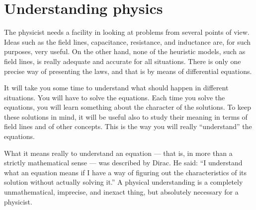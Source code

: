 \section{Understanding physics}

The physicist needs a facility in looking at problems from several points of view.
Ideas such as the field lines, capacitance, resistance, and inductance are,
for such purposes, very useful.
On the other hand, none of the heuristic models, such as field lines,
is really adequate and accurate for all situations.
There is only one precise way of presenting the laws,
and that is by means of differential equations.

It will take you some time to understand what should happen in different situations.
You will have to solve the equations.
Each time you solve the equations, 
you will learn something about the character of the solutions.
To keep these solutions in mind, it will be useful also 
to study their meaning in terms of field lines and of other concepts.
This is the way you will really ``understand'' the equations.

What it means really to understand an equation ---
that is, in more than a strictly mathematical sense ---
was described by Dirac.  He said:
``I understand what an equation means if I have a way of figuring out 
the characteristics of its solution without actually solving it.''
A physical understanding is a completely unmathematical, imprecise, and inexact thing,
but absolutely necessary for a physicist.

\newpage


